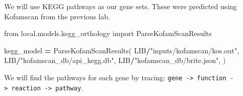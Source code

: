 \documentclass[
]{book}
\newenvironment{Shaded}{\begin{snugshade}}{\end{snugshade}}
\newcommand{\ImportTok}[1]{#1}
\newcommand{\NormalTok}[1]{#1}
\newcommand{\OperatorTok}[1]{\textcolor[rgb]{0.81,0.36,0.00}{\textbf{#1}}}
\newcommand{\StringTok}[1]{\textcolor[rgb]{0.31,0.60,0.02}{#1}}
\begin{document}
We will use KEGG pathways as our gene sets. These were predicted using Kofamscan from the previous lab.

\begin{Shaded}
\begin{Highlighting}[numbers=left,,]
\ImportTok{from}\NormalTok{ local.models.kegg\_orthology }\ImportTok{import}\NormalTok{ ParseKofamScanResults}

\NormalTok{kegg\_model }\OperatorTok{=}\NormalTok{ ParseKofamScanResults(}
\NormalTok{    LIB}\OperatorTok{/}\StringTok{"inputs/kofamscan/kos.out"}\NormalTok{,}
\NormalTok{    LIB}\OperatorTok{/}\StringTok{"kofamscan\_db/api\_kegg.db"}\NormalTok{,}
\NormalTok{    LIB}\OperatorTok{/}\StringTok{"kofamscan\_db/brite.json"}\NormalTok{,}
\NormalTok{)}
\end{Highlighting}
\end{Shaded}

We will find the pathways for each gene by tracing: \texttt{gene\ -\textgreater{}\ function\ -\textgreater{}\ reaction\ -\textgreater{}\ pathway}.
\end{document}
